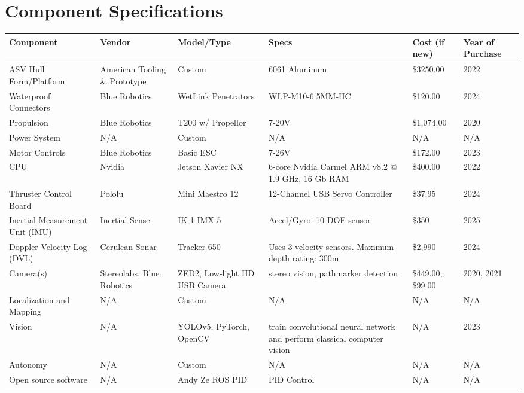 \documentclass[conference]{IEEEtran}
\begin{document}
\clearpage
\section{Component Specifications}

\begin{table}[htbp]
\begin{tabularx}{\textwidth}{|L|L|L|L|L|L|}
    \hline
        Component & Vendor & Model/Type & Specs & Cost (if new) & Year of Purchase \\ \hline
        ASV Hull Form/Platform  & American Tooling \& Prototype & Custom & 6061 Aluminum & \$3250.00 & 2022 \\ \hline
        Waterproof Connectors & Blue Robotics & WetLink Penetrators & WLP-M10-6.5MM-HC & \$120.00 & 2024 \\ \hline
        Propulsion  & Blue Robotics & T200 w/ Propellor & 7-20V & \$1,074.00  & 2020\\ \hline
        Power System & N/A & Custom & N/A & N/A & N/A \\ \hline
        Motor Controls  & Blue Robotics & Basic ESC & 7-26V & \$172.00  & 2023 \\ \hline
        CPU & Nvidia & Jetson Xavier NX & 6-core Nvidia Carmel ARM v8.2 @ 1.9 GHz, 16 Gb RAM & \$400.00  & 2022 \\ \hline
        Thruster Control Board  & Pololu & Mini Maestro 12 & 12-Channel USB Servo Controller & \$37.95  & 2024 \\ \hline
        Inertial Measurement Unit (IMU)  & Inertial Sense & IK-1-IMX-5 & Accel/Gyro: 10-DOF sensor & \$350 & 2025 \\ \hline
        Doppler Velocity Log (DVL) & Cerulean Sonar & Tracker 650 & Uses 3 velocity sensors. Maximum depth rating: 300m & \$2,990 & 2024 \\ \hline
        Camera(s) & Stereolabs, Blue Robotics & ZED2, Low-light HD USB Camera & stereo vision, pathmarker detection & \$449.00, \$99.00  & 2020, 2021 \\ \hline
        Localization and Mapping  & N/A & Custom & N/A & N/A & N/A \\ \hline
        Vision  & N/A & YOLOv5, PyTorch, OpenCV & train convolutional neural network and perform classical computer vision & N/A & 2023 \\ \hline
        Autonomy  & N/A & Custom & N/A & N/A & N/A \\ \hline
        Open source software & N/A & Andy Ze ROS PID & PID Control & N/A & N/A \\ \hline
    \end{tabularx}
\label{tab1e}
\end{table}
\end{document}
